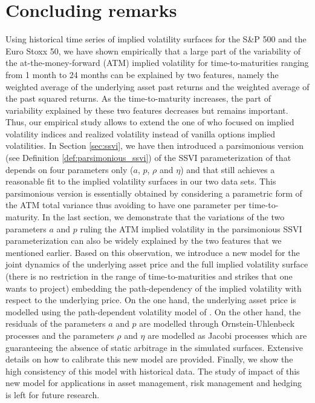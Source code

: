 \section{Concluding remarks}
Using historical time series of implied volatility surfaces for the S\&P 500 and the Euro Stoxx 50, we have shown empirically that a large part of the variability of the at-the-money-forward (ATM) implied volatility for time-to-maturities ranging from 1 month to 24 months can be explained by two features, namely the weighted average of the underlying asset past returns and the weighted average of the past squared returns. As the time-to-maturity increases, the part of variability explained by these two features decreases but remains important. Thus, our empirical study allows to extend the one of \cite{guyon2022volatility}  who focused on implied volatility indices and realized volatility instead of vanilla options implied volatilities. In Section \ref{sec:ssvi}, we have then introduced a parsimonious version (see Definition \ref{def:parsimonious_ssvi}) of the SSVI parameterization of \cite{gatheral2014arbitrage} that depends on four parameters only ($a$, $p$, $\rho$ and $\eta$) and that still achieves a reasonable fit to the implied volatility surfaces in our two data sets. This parsimonious version is essentially obtained by considering a parametric form of the ATM total variance thus avoiding to have one parameter per time-to-maturity. In the last section, we demonstrate that the variations of the two parameters $a$ and $p$ ruling the ATM implied volatility in the parsimonious SSVI parameterization can also be widely explained by the two features that we mentioned earlier. Based on this observation, we introduce a new model for the joint dynamics of the underlying asset price and the full implied volatility surface (there is no restriction in the range of time-to-maturities and strikes that one wants to project) embedding the path-dependency of the implied volatility with respect to the underlying price. On the one hand, the underlying asset price is modelled using the path-dependent volatility model of \cite{guyon2022volatility}. On the other hand, the residuals of the parameters $a$ and $p$ are modelled through Ornstein-Uhlenbeck processes and the parameters $\rho$ and $\eta$ are modelled as Jacobi processes which are guaranteeing the absence of static arbitrage in the simulated surfaces.  Extensive details on how to calibrate this new model are provided. Finally, we show the high consistency of this model with historical data. The study of impact of this new model for applications in asset management, risk management and hedging is left for future research. 
